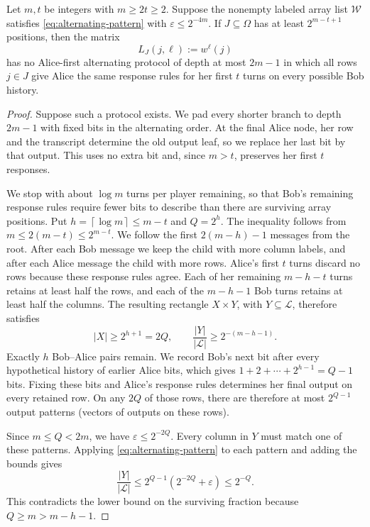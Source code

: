 \documentclass[11pt,letterpaper]{article} \usepackage[utf8]{inputenc}
\theoremstyle{plain} \newtheorem{theorem}{Theorem}[section]
\theoremstyle{definition} \newaliascnt{definition}{theorem}
\newcommand{\ceil}[1]{\left\lceil#1\right\rceil}
\begin{document}
\begin{lemma}\label{yao:small-bias-escape}
Let $m,t$ be integers with $m\ge2t\ge2$. Suppose the nonempty labeled
array list $\mathcal W$ satisfies \cref{eq:alternating-pattern} with
$\varepsilon\le2^{-4m}$. If $J\subseteq\Omega$ has at least
$2^{m-t+1}$ positions, then the matrix
\[
L_J(j,\ell):=w^\ell(j)
\]
has no Alice-first alternating protocol of depth at most $2m-1$ in which all
rows $j\in J$ give Alice the same response rules for her first $t$ turns on every possible Bob history.
\end{lemma}
\begin{proof}
Suppose such a protocol exists. We pad every shorter branch to depth $2m-1$
with fixed bits in the alternating order. At the final Alice node, her row and the transcript
determine the old output leaf, so we replace her last bit by that output. This
uses no extra bit and, since $m>t$, preserves her first $t$ responses.

We stop with about $\log m$ turns per player remaining, so that Bob's
remaining response rules require fewer bits to describe than there are
surviving array positions.
Put $h=\ceil{\log m}\le m-t$ and $Q=2^h$. The inequality follows from
$m\le2(m-t)\le2^{m-t}$. We follow the first $2(m-h)-1$ messages from the root.
After each Bob message we keep the child with more column labels, and after
each Alice message the child with more rows.
Alice's first $t$ turns discard no rows because these response rules agree.
Each of her remaining $m-h-t$ turns retains at least half the rows,
and each of the $m-h-1$ Bob turns retains at least half the columns.
The resulting rectangle $X\times Y$, with $Y\subseteq\mathcal L$, therefore satisfies
\[
|X|\ge2^{h+1}=2Q,\qquad
\frac{|Y|}{|\mathcal L|}\ge2^{-(m-h-1)}.
\]
Exactly $h$ Bob--Alice pairs remain. We record Bob's next bit after every
hypothetical history of earlier Alice bits, which gives
$1+2+\cdots+2^{h-1}=Q-1$ bits. Fixing these bits and Alice's response rules determines
her final output on every retained row. On any $2Q$ of those rows, there are
therefore at most $2^{Q-1}$ output patterns (vectors of outputs on these rows).

Since $m\le Q<2m$, we have $\varepsilon\le2^{-2Q}$. Every column in $Y$
must match one of these patterns. Applying \cref{eq:alternating-pattern}
to each pattern and adding the bounds gives
\[
\frac{|Y|}{|\mathcal L|}\le2^{Q-1}(2^{-2Q}+\varepsilon)\le2^{-Q}.
\]
This contradicts the lower bound on the surviving fraction because
$Q\ge m>m-h-1$.
\end{proof}
\end{document}
